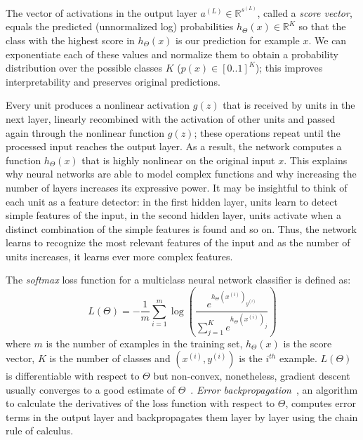 The vector of activations in the output layer $a^{(L)} \in \mathbb{R}^{s^{(L)}}$, called a \emph{score vector}, equals the predicted (unnormalized log) probabilities $h_\Theta(x) \in \mathbb{R}^K$ so that the class with the highest score in $h_\Theta(x)$ is our prediction for example $x$. We can exponentiate each of these values and normalize them to obtain a probability distribution over the possible classes $K$ ($p(x) \in [0..1]^K$); this improves interpretability and preserves original predictions.

Every unit produces a nonlinear activation $g(z)$ that is received by units in the next layer, linearly recombined with the activation of other units and passed again through the nonlinear function $g(z)$; these operations repeat until the processed input reaches the output layer. As a result, the network computes a function $h_\Theta(x)$ that is highly nonlinear on the original input $x$. This explains why neural networks are able to model complex functions and why increasing the number of layers increases its expressive power. It may be insightful to think of each unit as a feature detector: in the first hidden layer, units learn to detect simple features of the input, in the second hidden layer, units activate when a distinct combination of the simple features is found and so on. Thus, the network learns to recognize the most relevant features of the input and as the number of units increases, it learns ever more complex features.

The \emph{softmax} loss function for a multiclass neural network classifier is defined as:
\begin{equation}
	L(\Theta) = -\frac{1}{m} \sum_{i=1}^m \log \left ( \frac{ e^{h_\Theta(x^{(i)})_{y^{(i)}}} }{ \sum_{j=1}^K e^{ h_\Theta (x^{(i)})_j} } \right )
\end{equation}
where $m$ is the number of examples in the training set, $h_\Theta(x)$ is the score vector, $K$ is the number of classes and $(x^{(i)},y^{(i)})$ is the $i^{th}$ example. $L(\Theta)$ is differentiable with respect to $\Theta$ but non-convex, nonetheless, gradient descent usually converges to a good estimate of $\Theta$~\cite{Ng2014}. \emph{Error backpropagation}~\cite{Linnainmaa1970, Werbos1974}, an algorithm to calculate the derivatives of the loss function with respect to $\Theta$, computes error terms in the output layer and backpropagates them layer by layer using the chain rule of calculus.

